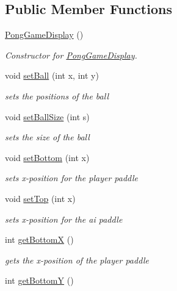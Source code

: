 \subsection*{Public Member Functions}
\begin{DoxyCompactItemize}
\item 
\hyperlink{classview_1_1_pong_game_display_a1d578a032b81c4025ba91e6366672e07}{Pong\+Game\+Display} ()
\begin{DoxyCompactList}\small\item\em Constructor for \hyperlink{classview_1_1_pong_game_display}{Pong\+Game\+Display}. \end{DoxyCompactList}\item 
void \hyperlink{classview_1_1_pong_game_display_ac6afa3842b0a26be46dd0b7d202d887d}{set\+Ball} (int x, int y)
\begin{DoxyCompactList}\small\item\em sets the positions of the ball \end{DoxyCompactList}\item 
void \hyperlink{classview_1_1_pong_game_display_a295d4a14e718454eb223a5bb06141d53}{set\+Ball\+Size} (int s)
\begin{DoxyCompactList}\small\item\em sets the size of the ball \end{DoxyCompactList}\item 
void \hyperlink{classview_1_1_pong_game_display_aeaaff1c8033efd2d7f3242ab3b6c7e9e}{set\+Bottom} (int x)
\begin{DoxyCompactList}\small\item\em sets x-\/position for the player paddle \end{DoxyCompactList}\item 
void \hyperlink{classview_1_1_pong_game_display_a8b9caa56b471453556b7380ee6d37340}{set\+Top} (int x)
\begin{DoxyCompactList}\small\item\em sets x-\/position for the ai paddle \end{DoxyCompactList}\item 
int \hyperlink{classview_1_1_pong_game_display_ab5d2d9429f7d666fea097c2ea3118893}{get\+BottomX} ()
\begin{DoxyCompactList}\small\item\em gets the x-\/position of the player paddle \end{DoxyCompactList}\item 
int \hyperlink{classview_1_1_pong_game_display_afa4d22c9959dc02057a1b56fef3f33cd}{get\+BottomY} ()

\end{DoxyCompactItemize}
